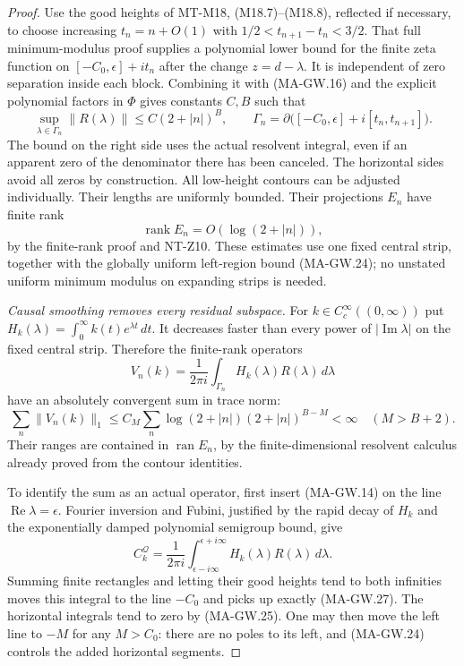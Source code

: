 \begin{proof}
Use the good heights of MT-M18, (M18.7)--(M18.8), reflected
if necessary, to choose increasing $t_n=n+O(1)$ with
$1/2<t_{n+1}-t_n<3/2$.
That full minimum-modulus proof supplies a polynomial
lower bound for the finite zeta function on
$[-C_0,\epsilon]+it_n$ after the change $z=d-\lambda$.
It is independent of zero separation inside each block.
Combining it with (MA-GW.16) and the explicit polynomial
factors in $\Phi$ gives constants $C,B$ such that
\[
 \sup_{\lambda\in\Gamma_n}\|R(\lambda)\|
      \le C(2+|n|)^B,\qquad
 \Gamma_n=\partial\bigl([-C_0,\epsilon]
                              +i[t_n,t_{n+1}]\bigr).
 \tag{MA-GW.25}
\]
The bound on the right side uses the actual resolvent
integral, even if an apparent zero of the denominator
there has been canceled.
The horizontal sides avoid all zeros by construction.
All low-height contours can be adjusted individually.
Their lengths are uniformly bounded.
Their projections $E_n$ have finite rank
\[
                           \operatorname{rank}E_n
                                     =O(\log(2+|n|)),
 \tag{MA-GW.26}
\]
by the finite-rank proof and NT-Z10.
These estimates use one fixed central strip, together
with the globally uniform left-region bound
(MA-GW.24); no unstated uniform minimum modulus on
expanding strips is needed.

\emph{Causal smoothing removes every residual subspace.}
For $k\in C_c^\infty((0,\infty))$ put
$H_k(\lambda)=\int_0^\infty k(t)e^{\lambda t}\,dt$.
It decreases faster than every power of
$|\operatorname{Im}\lambda|$ on the fixed central strip.
Therefore the finite-rank operators
\[
       V_n(k)=\frac1{2\pi i}\int_{\Gamma_n}
                                  H_k(\lambda)R(\lambda)\,d\lambda
 \tag{MA-GW.27}
\]
have an absolutely convergent sum in trace norm:
\[
 \sum_n\|V_n(k)\|_1
 \le C_M\sum_n\log(2+|n|)(2+|n|)^{B-M}<\infty
                                             \quad(M>B+2).
 \tag{MA-GW.28}
\]
Their ranges are contained in $\operatorname{ran}E_n$,
by the finite-dimensional resolvent calculus already
proved from the contour identities.

To identify the sum as an actual operator, first insert
(MA-GW.14) on the line $\operatorname{Re}\lambda=\epsilon$.
Fourier inversion and Fubini, justified by the rapid
decay of $H_k$ and the exponentially damped polynomial
semigroup bound, give
\[
 C_k^{\mathcal Q}
     =\frac1{2\pi i}\int_{\epsilon-i\infty}^{\epsilon+i\infty}
                                    H_k(\lambda)R(\lambda)\,d\lambda .
 \tag{MA-GW.29}
\]
Summing finite rectangles and letting their good heights
tend to both infinities moves this integral to the line
$-C_0$ and picks up exactly (MA-GW.27).
The horizontal integrals tend to zero by (MA-GW.25).
One may then move the left line to $-M$ for any $M>C_0$:
there are no poles to its left, and (MA-GW.24) controls
the added horizontal segments.


\end{proof}
